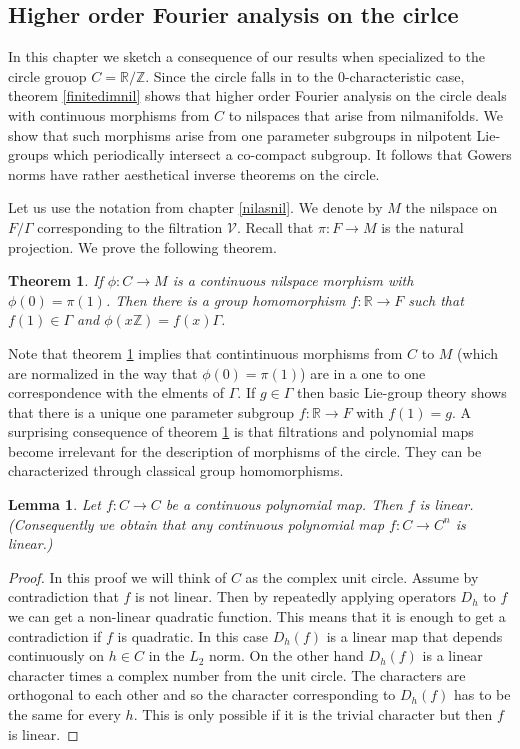 \documentclass [11pt] {article}
\newtheorem{lemma}{Lemma}[section]
\newtheorem{theorem}{Theorem}
\begin{document}
\subsection{Higher order Fourier analysis on the cirlce}\label{chap:circle}

In this chapter we sketch a consequence of our results when specialized to the circle grouop $C=\mathbb{R}/\mathbb{Z}$.
Since the circle falls in to the $0$-characteristic case, theorem \ref{finitedimnil} shows that higher order Fourier analysis on the circle deals with continuous morphisms from $C$ to nilspaces that arise from nilmanifolds. We show that such morphisms arise from one parameter subgroups in nilpotent Lie-groups which periodically intersect a co-compact subgroup. It follows that Gowers norms have rather aesthetical inverse theorems on the circle.

Let us use the notation from chapter \ref{nilasnil}. We denote by $M$ the nilspace on $F/\Gamma$ corresponding to the filtration $\mathcal{V}$. Recall that $\pi:F\rightarrow M$ is the natural projection. We prove the following theorem. 

\begin{theorem}\label{circhom} If $\phi:C\rightarrow M$ is a continuous nilspace morphism with $\phi(0)=\pi(1)$. Then there is a group homomorphism $f:\mathbb{R}\rightarrow F$ such that $f(1)\in\Gamma$ and $\phi(x\mathbb{Z})=f(x)\Gamma$.
\end{theorem}

Note that theorem \ref{circhom} implies that contintinuous morphisms from $C$ to $M$ (which are normalized in the way that $\phi(0)=\pi(1)$) are in a one to one correspondence with the elments of $\Gamma$. If $g\in\Gamma$ then basic Lie-group theory shows that there is a unique one parameter subgroup $f:\mathbb{R}\rightarrow F$ with $f(1)=g$. 
A surprising consequence of theorem \ref{circhom} is that filtrations and polynomial maps become irrelevant for the description of morphisms of the circle. They can be characterized through classical group homomorphisms.

\begin{lemma}\label{lin} Let $f:C\rightarrow C$ be a continuous polynomial map. Then $f$ is linear. (Consequently we obtain that any continuous polynomial map $f:C\rightarrow C^n$ is linear.)
\end{lemma}

\begin{proof} In this proof we will think of $C$ as the complex unit circle. Assume by contradiction that $f$ is not linear. Then by repeatedly applying operators $D_h$ to $f$ we can get a non-linear quadratic function.
This means that it is enough to get a contradiction if $f$ is quadratic.
In this case $D_h(f)$ is a linear map that depends continuously on $h\in C$ in the $L_2$ norm. On the other hand  $D_h(f)$ is a linear character times a complex number from the unit circle. The characters are orthogonal to each other and so the character corresponding to $D_h(f)$ has to be the same for every $h$. This is only possible if it is the trivial character but then $f$ is linear.
\end{proof}
\end{document}
